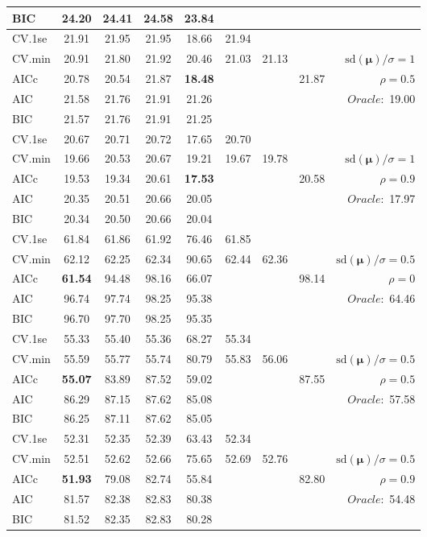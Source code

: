 \begin{table}
\begin{center}
\begin{tabular}{l*{7}{c}|r}
BIC & 24.20 & 24.41 & 24.58 & 23.84 & & & &  \\
 \hline 
CV.1se & 21.91 & 21.95 & 21.95 & 18.66 & 21.94 & & & \\
CV.min & 20.91 & 21.80 & 21.92 & 20.46 & 21.03 & 21.13 & & $\mathrm{sd}(\mathbf{\mu})/\sigma=1$ \\
AICc & 20.78 & 20.54 & 21.87 & {\bf 18.48} & & & 21.87 &  $\rho=0.5$ \\
AIC & 21.58 & 21.76 & 21.91 & 21.26 & & & &  \multirow{2}{*}{$Oracle: $ 19.00} \\
BIC & 21.57 & 21.76 & 21.91 & 21.25 & & & &  \\
 \hline 
CV.1se & 20.67 & 20.71 & 20.72 & 17.65 & 20.70 & & & \\
CV.min & 19.66 & 20.53 & 20.67 & 19.21 & 19.67 & 19.78 & & $\mathrm{sd}(\mathbf{\mu})/\sigma=1$ \\
AICc & 19.53 & 19.34 & 20.61 & {\bf 17.53} & & & 20.58 &  $\rho=0.9$ \\
AIC & 20.35 & 20.51 & 20.66 & 20.05 & & & &  \multirow{2}{*}{$Oracle: $ 17.97} \\
BIC & 20.34 & 20.50 & 20.66 & 20.04 & & & &  \\
 \hline 
CV.1se & 61.84 & 61.86 & 61.92 & 76.46 & 61.85 & & & \\
CV.min & 62.12 & 62.25 & 62.34 & 90.65 & 62.44 & 62.36 & & $\mathrm{sd}(\mathbf{\mu})/\sigma=0.5$ \\
AICc & {\bf 61.54} & 94.48 & 98.16 & 66.07 & & & 98.14 &  $\rho=0$ \\
AIC & 96.74 & 97.74 & 98.25 & 95.38 & & & &  \multirow{2}{*}{$Oracle: $ 64.46} \\
BIC & 96.70 & 97.70 & 98.25 & 95.35 & & & &  \\
 \hline 
CV.1se & 55.33 & 55.40 & 55.36 & 68.27 & 55.34 & & & \\
CV.min & 55.59 & 55.77 & 55.74 & 80.79 & 55.83 & 56.06 & & $\mathrm{sd}(\mathbf{\mu})/\sigma=0.5$ \\
AICc & {\bf 55.07} & 83.89 & 87.52 & 59.02 & & & 87.55 &  $\rho=0.5$ \\
AIC & 86.29 & 87.15 & 87.62 & 85.08 & & & &  \multirow{2}{*}{$Oracle: $ 57.58} \\
BIC & 86.25 & 87.11 & 87.62 & 85.05 & & & &  \\
 \hline 
CV.1se & 52.31 & 52.35 & 52.39 & 63.43 & 52.34 & & & \\
CV.min & 52.51 & 52.62 & 52.66 & 75.65 & 52.69 & 52.76 & & $\mathrm{sd}(\mathbf{\mu})/\sigma=0.5$ \\
AICc & {\bf 51.93} & 79.08 & 82.74 & 55.84 & & & 82.80 &  $\rho=0.9$ \\
AIC & 81.57 & 82.38 & 82.83 & 80.38 & & & &  \multirow{2}{*}{$Oracle: $ 54.48} \\
BIC & 81.52 & 82.35 & 82.83 & 80.28 & & & &  \\
 \hline 
\end{tabular}
\end{center}
\vspace{-1cm}
\end{table}




